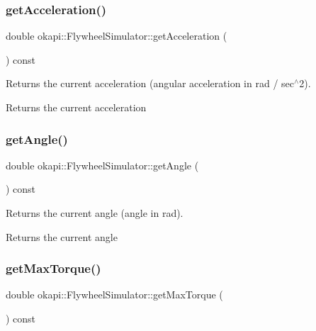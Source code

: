 \subsubsection{\texorpdfstring{getAcceleration()}{getAcceleration()}}
{\footnotesize\ttfamily double okapi\+::\+Flywheel\+Simulator\+::get\+Acceleration (\begin{DoxyParamCaption}{ }\end{DoxyParamCaption}) const}

Returns the current acceleration (angular acceleration in rad / sec$^\wedge$2).

\begin{DoxyReturn}{Returns}
the current acceleration 
\end{DoxyReturn}
\mbox{\label{classokapi_1_1FlywheelSimulator_a506f126c88bf66759d2d31844b7f50e6}} 
\subsubsection{\texorpdfstring{getAngle()}{getAngle()}}
{\footnotesize\ttfamily double okapi\+::\+Flywheel\+Simulator\+::get\+Angle (\begin{DoxyParamCaption}{ }\end{DoxyParamCaption}) const}

Returns the current angle (angle in rad).

\begin{DoxyReturn}{Returns}
the current angle 
\end{DoxyReturn}
\mbox{\label{classokapi_1_1FlywheelSimulator_a028341fbfce013426a70fe74a7b0b584}} 
\subsubsection{\texorpdfstring{getMaxTorque()}{getMaxTorque()}}
{\footnotesize\ttfamily double okapi\+::\+Flywheel\+Simulator\+::get\+Max\+Torque (\begin{DoxyParamCaption}{ }\end{DoxyParamCaption}) const}

